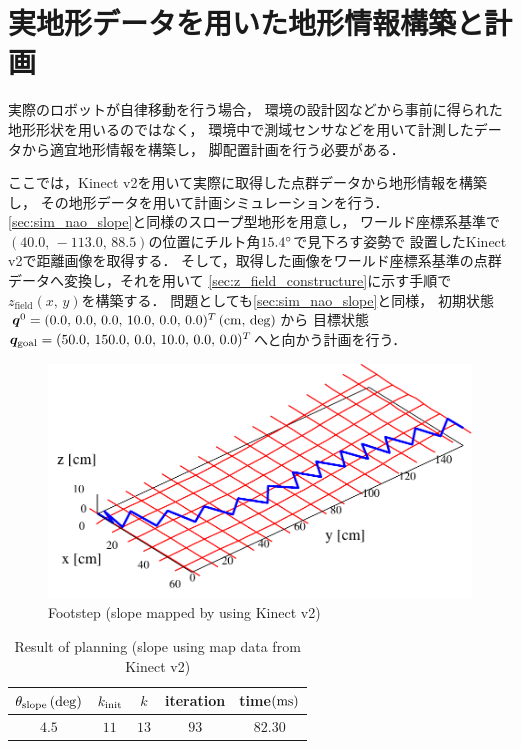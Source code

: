 \documentclass[autodetect-engine,dvipdfmx-if-dvi,ja=standard,a4j,jbase=11pt,magstyle=nomag*]{bxjsreport}
\begin{document}
\section{実地形データを用いた地形情報構築と計画}
実際のロボットが自律移動を行う場合，
環境の設計図などから事前に得られた地形形状を用いるのではなく，
環境中で測域センサなどを用いて計測したデータから適宜地形情報を構築し，
脚配置計画を行う必要がある．

ここでは，Kinect v2を用いて実際に取得した点群データから地形情報を構築し，
その地形データを用いて計画シミュレーションを行う．
\cref{sec:sim_nao_slope}と同様のスロープ型地形を用意し，
ワールド座標系基準で$(40.0 ,\, -113.0 ,\, 88.5)$の位置にチルト角$15.4\degree$で見下ろす姿勢で
設置したKinect v2で距離画像を取得する．
そして，取得した画像をワールド座標系基準の点群データへ変換し，それを用いて
\cref{sec:z_field_constructure}に示す手順で$z_\mathrm{field}(x ,\, y)$を構築する．
問題としても\cref{sec:sim_nao_slope}と同様，
初期状態$\bm{q}^0 = ( 0.0 ,\, 0.0 ,\, 0.0 ,\, 10.0 ,\, 0.0 ,\, 0.0 )^T\,(\si{\centi\meter} ,\, \mathrm{deg})$から
目標状態$\bm{q}_{\mathrm{goal}} = ( 50.0 ,\, 150.0 ,\, 0.0 ,\, 10.0 ,\, 0.0 ,\, 0.0 )^T$へと向かう計画を行う．

\begin{figure}[t]%
    \centering
    \includegraphics[width=0.8\linewidth, clip]{./figure/sim_nao_slope_45_kinect.pdf}%
    \caption{Footstep (slope mapped by using Kinect v2)}%
    \label{fig:sim_nao_slope_kinect}%
\end{figure}
\begin{table}[t]%
    \centering%
    \caption{Result of planning (slope using map data from Kinect v2)}%
    \label{tab:sim_nao_slope_kinect}%
    \begin{tabular}{ccccc}%
        \toprule%
        $\theta_{\mathrm{slope}}\,(\mathrm{deg})$ &   $k_{\mathrm{init}}$ &   $k$     &   iteration   &   time$(\si{\milli\second})$ \\%
        \midrule%
        $4.5$                       &   $11$        &   $13$    &   $93$        &   $82.30$ \\%
        \bottomrule%
    \end{tabular}
\end{table}
\end{document}
